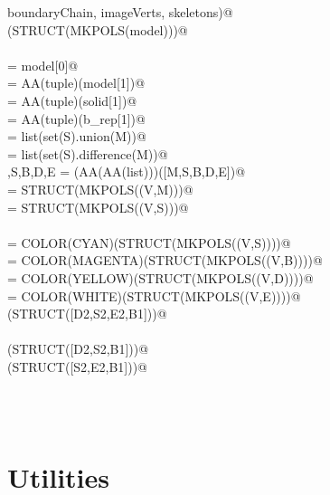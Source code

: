 \documentclass[11pt,oneside]{article}	%
\begin{document}
\begin{flushleft}
\begin{minipage}{\linewidth}
\begin{list}{}{}
\mbox{}\verb@            boundaryChain, imageVerts, skeletons)@\\
\mbox{}\verb@VIEW(STRUCT(MKPOLS(model)))@\\
\mbox{}\verb@@\\
\mbox{}\verb@V = model[0]@\\
\mbox{}\verb@M = AA(tuple)(model[1])@\\
\mbox{}\verb@S = AA(tuple)(solid[1])@\\
\mbox{}\verb@B = AA(tuple)(b_rep[1])@\\
\mbox{}\verb@D = list(set(S).union(M))@\\
\mbox{}\verb@E = list(set(S).difference(M))@\\
\mbox{}\verb@M,S,B,D,E = (AA(AA(list)))([M,S,B,D,E])@\\
\mbox{} = STRUCT(MKPOLS((V,M)))@\\
\mbox{} = STRUCT(MKPOLS((V,S)))@\\
\mbox{}\verb@@\\
\mbox{} = COLOR(CYAN)(STRUCT(MKPOLS((V,S))))@\\
\mbox{} = COLOR(MAGENTA)(STRUCT(MKPOLS((V,B))))@\\
\mbox{} = COLOR(YELLOW)(STRUCT(MKPOLS((V,D))))@\\
\mbox{} = COLOR(WHITE)(STRUCT(MKPOLS((V,E))))@\\
\mbox{}\verb@VIEW(STRUCT([D2,S2,E2,B1]))@\\
\mbox{}\verb@@\\
\mbox{}\verb@VIEW(STRUCT([D2,S2,B1]))@\\
\mbox{}\verb@VIEW(STRUCT([S2,E2,B1]))@\\
\mbox{}\verb@@\\
\mbox{}\verb@@{\NWsep}
\end{list}
\vspace{-2ex}
\end{minipage}\\[4ex]
\end{flushleft}



\appendix
\section{Utilities}
\end{document}
